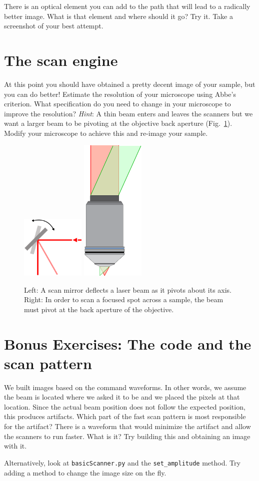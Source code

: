 \documentclass[a4paper]{report}
\begin{document}
\noindent
There is an optical element you can add to the path that will lead to a radically better image. 
What is that element and where should it go? Try it. 
Take a screenshot of your best attempt.




\section{The scan engine}
At this point you should have obtained a pretty decent image of your sample, but you can do better!
Estimate the resolution of your microscope using Abbe's criterion. 
What specification do you need to change in your microscope to improve the resolution?
\emph{Hint}: A thin beam enters and leaves the scanners but we want a larger beam to be pivoting at the objective back aperture  (Fig.~\ref{pivot}).
Modify your microscope to achieve this and re-image your sample.


\begin{figure}[h]
\centering
\includegraphics[width=1.2in]{ScanMirrorBeam.eps}
\includegraphics[width=1.2in]{Objective_pivot.eps}
\caption{Left: A scan mirror deflects a laser beam as it pivots about its axis.
Right: In order to scan a focused spot across a sample, the beam must pivot at the back aperture of the objective. }
\label{pivot}
\end{figure}

\section{Bonus Exercises: The code and the scan pattern}
We built images based on the command waveforms. 
In other words, we assume the beam is located where we asked it to be and we placed the pixels at that location.
Since the actual beam position does not follow the expected position, this produces artifacts. 
Which part of the fast scan pattern is most responsible for the artifact?
There is a waveform that would minimize the artifact and allow the scanners to run faster. What is it? Try building this and obtaining an image with it. 

Alternatively, look at \texttt{basicScanner.py} and the \texttt{set\_amplitude} method. Try adding a method to change the image size on the fly. 
\end{document}
